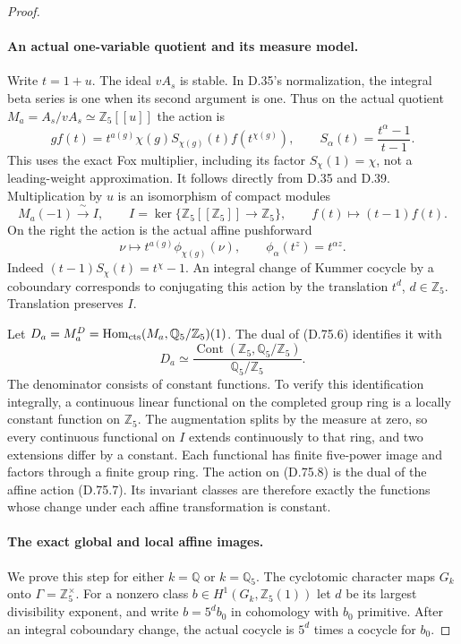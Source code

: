 \begin{proof}
\paragraph{An actual one-variable quotient and its measure model.}
Write \(t=1+u\). The ideal \(vA_s\) is stable. In D.35's
normalization, the integral beta series is one when its second
argument is one. Thus on the actual quotient
\(M_a=A_s/vA_s\simeq\mathbb Z_5[[u]]\) the action is
\[
 g f(t)=t^{a(g)}\chi(g)S_{\chi(g)}(t)f(t^{\chi(g)}),
 \qquad S_\alpha(t)=\frac{t^\alpha-1}{t-1}.
                                                               \tag{D.75.5}
\]
This uses the exact Fox multiplier, including its factor
\(S_{\chi}(1)=\chi\), not a leading-weight approximation.
It follows directly from D.35 and D.39.
Multiplication by \(u\) is an isomorphism of compact modules
\[
 M_a(-1)\xrightarrow{\ \sim\ }I,\qquad
 I=\ker\{\mathbb Z_5[[\mathbb Z_5]]\longrightarrow\mathbb Z_5\},
 \qquad f(t)\longmapsto(t-1)f(t).                            \tag{D.75.6}
\]
On the right the action is the actual affine pushforward
\[
                  \nu\longmapsto t^{a(g)}\phi_{\chi(g)}(\nu),
 \qquad \phi_\alpha(t^z)=t^{\alpha z}.
                                                               \tag{D.75.7}
\]
Indeed \((t-1)S_\chi(t)=t^\chi-1\).
An integral change of Kummer cocycle by a coboundary corresponds
to conjugating this action by the translation \(t^d\), \(d\in\mathbb Z_5\).
Translation preserves \(I\).

Let \(D_a=M_a^D=\operatorname{Hom}_{\rm cts}(M_a,\mathbb Q_5/\mathbb Z_5)(1)\).
The dual of (D.75.6) identifies it with
\[
 D_a\simeq
 \frac{\operatorname{Cont}(\mathbb Z_5,\mathbb Q_5/\mathbb Z_5)}
                         {\mathbb Q_5/\mathbb Z_5}.
                                                               \tag{D.75.8}
\]
The denominator consists of constant functions. To verify this
identification integrally, a continuous linear functional on the
completed group ring is a locally constant function on \(\mathbb Z_5\).
The augmentation splits by the measure at zero, so every continuous
functional on \(I\) extends continuously to that ring, and two extensions
differ by a constant. Each functional has finite five-power image
and factors through a finite group ring. The action on (D.75.8)
is the dual of the affine action (D.75.7). Its invariant classes
are therefore exactly the functions whose change under each
affine transformation is constant.

\paragraph{The exact global and local affine images.}
We prove this step for either \(k=\mathbb Q\) or \(k=\mathbb Q_5\).
The cyclotomic character maps \(G_k\) onto
\(\Gamma=\mathbb Z_5^\times\). For a nonzero class
\(b\in H^1(G_k,\mathbb Z_5(1))\) let \(d\) be its largest
divisibility exponent, and write \(b=5^d b_0\) in cohomology
with \(b_0\) primitive. After an integral coboundary change,
the actual cocycle is \(5^d\) times a cocycle for \(b_0\).


\end{proof}
